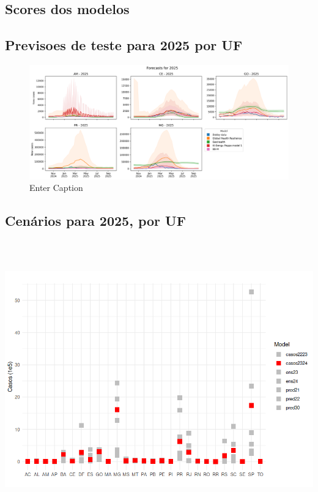 \subsection{Scores dos modelos}


\subsection{Previsoes de teste para 2025 por UF}

\begin{figure}
    \centering
    \includegraphics[width=1\linewidth]{figures/forecasts_2025.png}
    \caption{Enter Caption}
    \label{fig:enter-label}
\end{figure}


\subsection{Cenários para 2025, por UF}

\includegraphics[height = 12cm]{sections/forecast2025.png}

